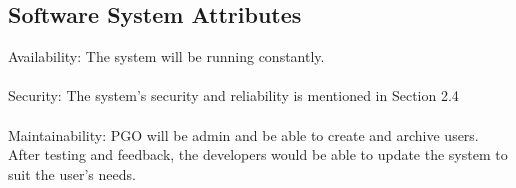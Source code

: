 \documentclass{article}
\begin{document}
\subsection{Software System Attributes}
Availability: The system will be running constantly.  \\ \\
Security: The system's security and reliability is mentioned in Section 2.4 \\ \\ 
Maintainability: PGO will be admin and be able to create and archive users. \\
After testing and feedback, the developers would be able to update the system to suit the user's needs.
\end{document}
